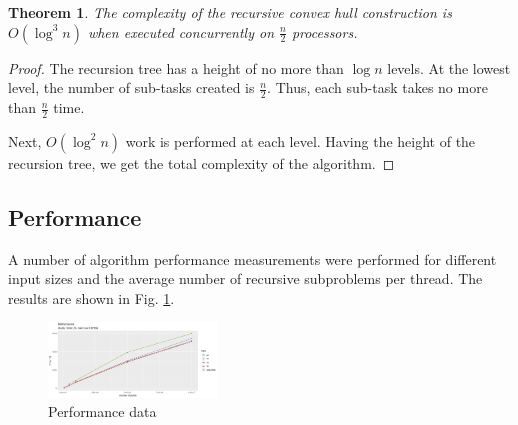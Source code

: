 \documentclass[conference]{IEEEtran}
\newtheorem{theorem}{Theorem}
\begin{document}
	\begin{theorem}
		The complexity of the recursive convex hull construction is $O(\log^3n)$ when executed concurrently on $\frac{n}{2}$ processors.
	\end{theorem}
	
	\begin{proof}
		The recursion tree has a height of no more than $\log n$ levels. At the lowest level, the number of sub-tasks created is $\frac{n}{2}$. Thus, each sub-task takes no more than $\frac{n}{2}$ time.
		
		Next, $O(\log^2 n)$ work is performed at each level. Having the height of the recursion tree, we get the total complexity of the algorithm.
	\end{proof}	
	

\subsection{Performance}


	A number of algorithm performance measurements were performed for different input sizes and the average number of recursive subproblems per thread. The results are shown in Fig. \ref{fig:performance}.
	
	\begin{figure}[h]
		\centering
		\includegraphics[width=0.4\textwidth, height=0.2\textheight]{performance}
		\caption{Performance data}
		\label{fig:performance}
	\end{figure}
\end{document}
